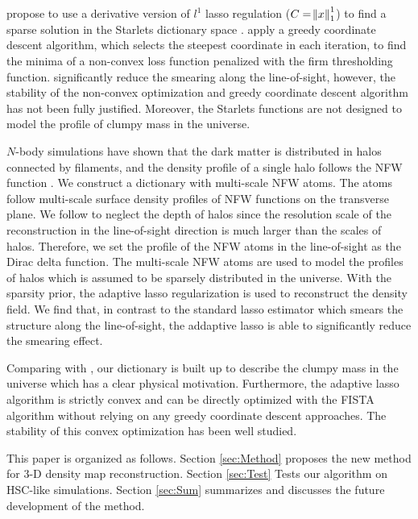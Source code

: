\documentclass[twocolumn]{aastex62}
\begin{document}
\citet{LSS-massMap-Glimpse3D-Leonard2014} propose to use a derivative version of $l^1$ lasso regulation ($C=\norm{x}^1_1$) 
to find a sparse solution in the Starlets dictionary space \citep{Starlet-Starck2015}. \citet{LSS-massMap-Glimpse3D-Leonard2014}
apply a greedy coordinate descent algorithm, which selects the steepest coordinate in each iteration, to find the minima 
of a non-convex loss function penalized with the firm thresholding function. \citet{LSS-massMap-Glimpse3D-Leonard2014} 
significantly reduce the smearing along the line-of-sight, however, the stability of the non-convex optimization and
greedy coordinate descent algorithm has not been fully justified. Moreover, the Starlets functions are not designed to 
model the profile of clumpy mass in the universe. 

$N$-body simulations have shown that the dark matter is distributed in halos connected by filaments, and the density 
profile of a single halo follows the NFW function \citep{halo-NFW1997ApJ}.
We construct a dictionary with multi-scale NFW atoms.  The atoms follow multi-scale surface density profiles of NFW 
functions \citep{haloModel-TJ2003-3pt} on the transverse plane. We follow \citet{LSS-massMap-Glimpse3D-Leonard2014} 
to neglect the depth of halos since the resolution scale of the reconstruction in the line-of-sight direction is much 
larger than the scales of halos. Therefore, we set the profile of the NFW atoms in the line-of-sight as the Dirac delta 
function. The multi-scale NFW atoms are used to model the profiles of halos which is assumed to be sparsely distributed 
in the universe. With the sparsity prior, the adaptive lasso regularization \citep{AdaLASSO-Zou2006} is used to reconstruct 
the density field. We find that, in contrast to the standard lasso estimator which smears the structure along the line-of-sight,
the addaptive lasso is able to significantly reduce the smearing effect.

Comparing with \citet{LSS-massMap-Glimpse3D-Leonard2014}, our dictionary is built up to describe the clumpy mass 
in the universe which has a clear physical motivation. Furthermore, the adaptive lasso algorithm is strictly convex and 
can be directly optimized with the FISTA algorithm \citep{FISTA-Beck2009} without relying on any greedy coordinate 
descent approaches.  The stability of this convex optimization has been well studied.

This paper is organized as follows.
Section \ref{sec:Method} proposes the new method for $3$-D density map reconstruction.
Section \ref{sec:Test} Tests our algorithm on HSC-like simulations.
Section \ref{sec:Sum} summarizes and discusses the future development of the method.
\end{document}
